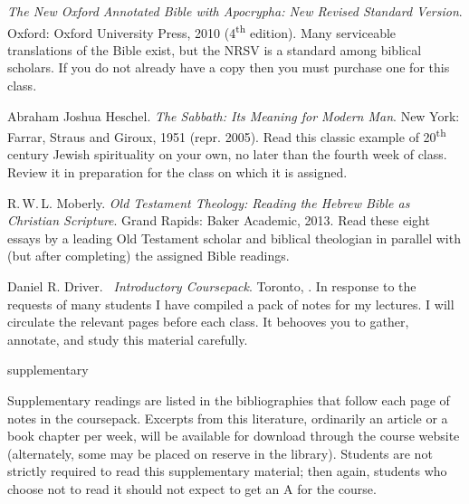\documentclass[titlepage]{article}
\begin{document}
\begingroup
\renewcommand{\section}[2]{}%
\begin{thebibliography}{Heschel}%

	 \emph{The New Oxford Annotated Bible with
	Apocrypha: New Revised Standard Version}. Oxford: Oxford University
	Press, 2010 (4\textsuperscript{th} edition). Many serviceable
	translations of the Bible exist, but the NRSV is a standard among
	biblical scholars. If you do not already have a copy then you must
	purchase one for this class.

	 Abraham Joshua Heschel. \emph{The
	Sabbath: Its Meaning for Modern Man}. New York: Farrar, Straus and
	Giroux, 1951 (repr. 2005). Read this classic example of
	20\textsuperscript{th} century Jewish spirituality on your own, no
	later than the fourth week of class. Review it in preparation for
	the class on which it is assigned.

	 R.\,W.\,L. Moberly. \emph{Old Testament
	Theology: Reading the Hebrew Bible as Christian Scripture}. Grand
	Rapids: Baker Academic, 2013. Read these eight essays by a leading
	Old Testament scholar and biblical theologian in parallel with (but
	after completing) the assigned Bible readings.

	 Daniel R. Driver. \emph{\ctitle\ Introductory
	Coursepack}. Toronto, \csemester. In response to the requests of
	many students I have compiled a pack of notes for my lectures. I
	will circulate the relevant pages before each class. It behooves you
	to gather, annotate, and study this material carefully.

\end{thebibliography}
\endgroup

\section{Supplementary Texts}
\label{supplementary}

Supplementary readings are listed in the bibliographies that follow each
page of notes in the coursepack. Excerpts from this literature,
ordinarily an article or a book chapter per week, will be available for
download through the course website (alternately, some may be placed on
reserve in the library). Students are not strictly required to read this
supplementary material; then again, students who choose not to read it
should not expect to get an A for the course.
\end{document}
